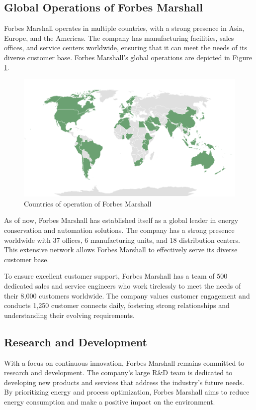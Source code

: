 \subsection{Global Operations of Forbes Marshall}
Forbes Marshall operates in multiple countries, with a strong presence in Asia, Europe, and the Americas. The company has manufacturing facilities, sales offices, and service centers worldwide, ensuring that it can meet the needs of its diverse customer base. Forbes Marshall's global operations are depicted in Figure \ref{fig:world_operations}.

\begin{figure}[h!]
    \centering
    \includegraphics[width=0.8\linewidth]{figs/world_operations.png}
    \caption{Countries of operation of Forbes Marshall}
    \label{fig:world_operations}
\end{figure}

As of now, Forbes Marshall has established itself as a global leader in energy conservation and automation solutions. The company has a strong presence worldwide with 37 offices, 6 manufacturing units, and 18 distribution centers. This extensive network allows Forbes Marshall to effectively serve its diverse customer base.

To ensure excellent customer support, Forbes Marshall has a team of 500 dedicated sales and service engineers who work tirelessly to meet the needs of their 8,000 customers worldwide. The company values customer engagement and conducts 1,250 customer connects daily, fostering strong relationships and understanding their evolving requirements.

\subsection{Research and Development}
With a focus on continuous innovation, Forbes Marshall remains committed to research and development. The company's large R\&D team is dedicated to developing new products and services that address the industry's future needs. By prioritizing energy and process optimization, Forbes Marshall aims to reduce energy consumption and make a positive impact on the environment.

